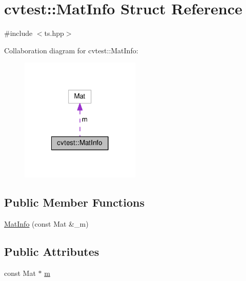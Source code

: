 \hypertarget{structcvtest_1_1MatInfo}{\section{cvtest\-:\-:Mat\-Info Struct Reference}
\label{structcvtest_1_1MatInfo}
}


{\ttfamily \#include $<$ts.\-hpp$>$}



Collaboration diagram for cvtest\-:\-:Mat\-Info\-:\nopagebreak
\begin{figure}[H]
\begin{center}
\leavevmode
\includegraphics[width=162pt]{structcvtest_1_1MatInfo__coll__graph}
\end{center}
\end{figure}
\subsection*{Public Member Functions}
\begin{DoxyCompactItemize}
\item 
\hyperlink{structcvtest_1_1MatInfo_a7d45900637f683fec7ac34e91a1863ac}{Mat\-Info} (const Mat \&\-\_\-m)
\end{DoxyCompactItemize}
\subsection*{Public Attributes}
\begin{DoxyCompactItemize}
\item 
const Mat $\ast$ \hyperlink{structcvtest_1_1MatInfo_aa09edb05e6d5d1bfcd7a658f19dab6f2}{m}
\end{DoxyCompactItemize}


